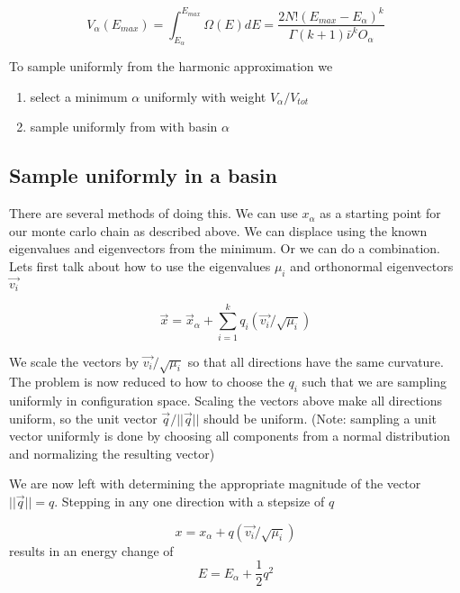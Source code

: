 \documentclass[a4paper]{article}
\begin{document}
\begin{equation}
  V_{\alpha}(E_{max}) = \int_{E_{\alpha}}^{E_{max}} \Omega(E) dE = \frac{2N!(E_{max} - E_\alpha)^{k} }{\Gamma(k+1) \bar{\nu}^k O_\alpha}
\end{equation}

To sample uniformly from the harmonic approximation we

\begin{enumerate}
  \item select a minimum $\alpha$ uniformly with weight $V_{\alpha} / V_{tot}$

  \item sample uniformly from with basin $\alpha$
\end{enumerate}

\subsection{Sample uniformly in a basin}

There are several methods of doing this.  We can use $x_{\alpha}$ as a starting
point for our monte carlo chain as described above.  We can displace using the known
eigenvalues and eigenvectors from the minimum.  Or we can do a combination.  Lets
first talk about how to use the eigenvalues $\mu_i$ and orthonormal eigenvectors $\vec{v_i}$ 

\begin{equation}
  \vec{x} = \vec{x}_{\alpha} + \sum_{i=1}^k q_i (\vec{v_i} / \sqrt{\mu_i})
  \label{eqn:step_away}
\end{equation}

We scale the vectors by $\vec{v_i} / \sqrt{\mu_i}$ so that all directions have
the same curvature.  The problem is now reduced to how to choose the $q_i$ such
that we are sampling uniformly in configuration space.  Scaling the vectors
above make all directions uniform, so the unit vector $\vec{q} / ||\vec{q}||$ should be 
uniform. (Note: sampling a unit vector uniformly is done by choosing all components from
a normal distribution and normalizing the resulting vector)

We are now left with determining the appropriate magnitude of the vector $||\vec{q}|| = q$.  Stepping in any one direction with a stepsize of $q$ 

\begin{equation}
  x = x_{\alpha} + q (\vec{v_i} / \sqrt{\mu_i})
\end{equation}
results in an energy change of
\begin{equation}
  E = E_{\alpha} + \frac{1}{2} q^2
  \label{eqn:echange}
\end{equation}
\end{document}

